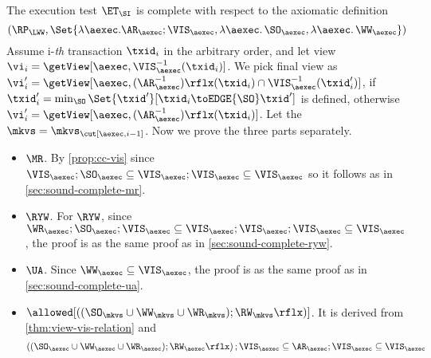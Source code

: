 The execution test $\ET_\SI$ is complete with respect to the axiomatic definition 
\[ (\RP_{\LWW}, \Set{\lambda \aexec.  \AR_\aexec ; \VIS_{\aexec}, \lambda \aexec \ldotp \SO_\aexec , \lambda \aexec \ldotp \WW_\aexec })\]
Assume i-\emph{th} transaction \( \txid_i \) in the arbitrary order,
and let view \( \vi_{i} = \getView[\aexec, \VIS^{-1}_{\aexec}(\txid_{i})] \).
We pick final view as \( \vi'_{i} = \getView[\aexec, (\AR^{-1}_{\aexec})\rflx(\txid_{i}) \cap \VIS_{\aexec}^{-1}(\txid'_i)] \),
if \( \txid'_i = \min_{\SO}\Set{\txid'}[\txid_i \toEDGE{\SO} \txid' ]\) is defined,
otherwise  \( \vi'_{i} = \getView[\aexec, (\AR^{-1}_{\aexec})\rflx(\txid_{i})]\).
Let the \( \mkvs = \mkvs_{\cut[\aexec, i-1]} \).
Now we prove the three parts separately.
\begin{itemize}
    \item \( \MR \).  By \cref{prop:cc-vis} since 
    \( \VIS_\aexec ; \SO_\aexec \subseteq \VIS_\aexec ; \VIS_\aexec \subseteq \VIS_\aexec \)
    so it follows as in \cref{sec:sound-complete-mr}.
    \item \( \RYW \). For \( \RYW \), since \( \WR_\aexec ; \SO_\aexec ; \VIS_\aexec \subseteq \VIS_\aexec ; \VIS_\aexec ; \VIS_\aexec \subseteq \VIS_\aexec\), 
    the proof is as the same proof as in \cref{sec:sound-complete-ryw}.
    \item \( \UA \). Since \( \WW_\aexec \subseteq \VIS_\aexec\), 
    the proof is as the same proof as in \cref{sec:sound-complete-ua}.
    \item \( \allowed[\left( (\SO_{\mkvs} \cup \WW_{\mkvs} \cup \WR_{\mkvs} ) ; \RW_{\mkvs}\rflx \right)]\). It is derived from \cref{thm:view-vis-relation} and 
        \[ \left( (\SO_{\aexec} \cup \WW_{\aexec} \cup \WR_{\aexec} ) ; \RW_{\aexec}\rflx \right) ; \VIS_\aexec \subseteq \AR_\aexec ; \VIS_\aexec \subseteq \VIS_\aexec\]
\end{itemize}
